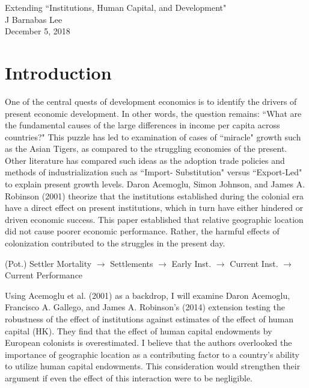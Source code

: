 \documentclass[12pt]{article}
\begin{document}
{ \selectfont


\begin{titlepage}
\vspace*{\fill}
\begin{center}
\Huge Extending ``Institutions, Human Capital, and Development"\\
\Large J Barnabas Lee\\
\small December 5, 2018
\end{center}
\vspace*{\fill}
\end{titlepage}

\section{Introduction}
\hspace{\parindent} One of the central quests of development economics is to identify the drivers of present economic development. In other words, the question remains: ``What are the fundamental causes of the
large differences in income per capita across countries?" This puzzle has led to examination of cases of ``miracle" growth such as the Asian Tigers, as compared to the struggling economies of the present.  Other literature has compared such ideas as the adoption trade policies and methods of industrialization such as ``Import- Substitution" versus ``Export-Led" to explain present growth levels. Daron Acemoglu, Simon Johnson, and James A. Robinson (2001) theorize that the institutions established during the colonial era have a direct effect on present institutions, which in turn have either hindered or driven economic success. This paper established that relative geographic location did not cause poorer economic performance. Rather, the harmful effects of colonization contributed to the struggles in the present day.

\begin{flushleft}
(Pot.) Settler Mortality $\rightarrow$ Settlements $\rightarrow$ Early Inst. $\rightarrow$ Current Inst. $\rightarrow$ Current Performance
\end{flushleft}

Using Acemoglu et al. (2001) as a backdrop, I will examine Daron Acemoglu, Francisco A. Gallego, and James A. Robinson's (2014) extension testing the robustness of the effect of institutions against estimates of the effect of human capital (HK). They find that the effect of human capital endowments by European colonists is overestimated. I believe that the authors overlooked the importance of geographic location as a contributing factor to a country's ability to utilize human capital endowments. This consideration would strengthen their argument if even the effect of this interaction were to be negligible.\\

}
\end{document}
